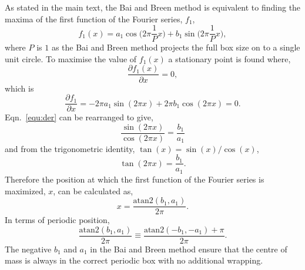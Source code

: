 \documentclass[reprint,superscriptaddress,nobibnotes,amsmath,amssymb,aip]{revtex4-2}
\begin{document}
As stated in the main text, the Bai and Breen method is equivalent to finding the maxima of the first function of the Fourier series, $f_1$,
%
\begin{equation}
    f_1(x) = a_1 \cos{\Big(2\pi\frac{1}{P} x\Big)} + b_1 \sin{\Big(2\pi\frac{1}{P} x\Big)},
\end{equation} 
%
where $P$ is $1$ as the Bai and Breen method projects the full box size on to a single unit circle. 
To maximise the value of $f_1(x)$ a stationary point is found where,
%
\begin{equation}
    \frac{\partial f_1(x)}{\partial x} = 0,
\end{equation}
%
which is 
%
\begin{equation}
    \frac{\partial f_1}{\partial x} = -2 \pi a_1 \sin( 2\pi x) + 2 \pi b_1 \cos( 2\pi x) = 0.
    \label{equ:der}
\end{equation}
%
Eqn.~\ref{equ:der} can be rearranged to give, 
%
\begin{equation}
\frac{\sin(2 \pi x)}{\cos(2 \pi x)} =  \frac{b_1}{a_1}
\end{equation}
%
and from the trigonometric identity, $\tan(x) = \sin(x) / \cos(x)$, 
%
\begin{equation}
    \tan(2 \pi x) = \frac{b_1}{a_1}.
\end{equation}
%
Therefore the position at which the first function of the Fourier series is maximized, $x$, can be calculated as, 
%
\begin{equation}
    x = \frac{\text{atan}2(b_1, a_1)}{2\pi}.
\end{equation}
%
In terms of periodic position, 
%
\begin{equation}
    \frac{\text{atan}2(b_1, a_1)}{2\pi} \equiv \frac{\text{atan}2(-b_1, -a_1) + \pi}{2\pi}.
\end{equation}
%
The negative $b_1$ and $a_1$ in the Bai and Breen method ensure that the centre of mass is always in the correct periodic box with no additional wrapping.

\nocite{*}

\end{document}
